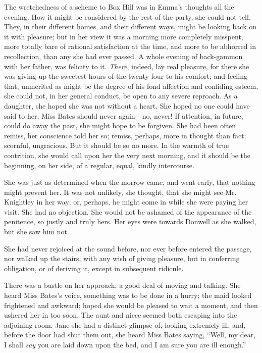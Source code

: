 The wretchedness of a scheme to Box Hill was in Emma's thoughts all the evening. How it might be considered by the rest of the party, she could not tell. They, in their different homes, and their different ways, might be looking back on it with pleasure; but in her view it was a morning more completely misspent, more totally bare of rational satisfaction at the time, and more to be abhorred in recollection, than any she had ever passed. A whole evening of back-gammon with her father, was felicity to it. {\em There}, indeed, lay real pleasure, for there she was giving up the sweetest hours of the twenty-four to his comfort; and feeling that, unmerited as might be the degree of his fond affection and confiding esteem, she could not, in her general conduct, be open to any severe reproach. As a daughter, she hoped she was not without a heart. She hoped no one could have said to her,  Miss Bates should never again---no, never! If attention, in future, could do away the past, she might hope to be forgiven. She had been often remiss, her conscience told her so; remiss, perhaps, more in thought than fact; scornful, ungracious. But it should be so no more. In the warmth of true contrition, she would call upon her the very next morning, and it should be the beginning, on her side, of a regular, equal, kindly intercourse.

She was just as determined when the morrow came, and went early, that nothing might prevent her. It was not unlikely, she thought, that she might see Mr. Knightley in her way; or, perhaps, he might come in while she were paying her visit. She had no objection. She would not be ashamed of the appearance of the penitence, so justly and truly hers. Her eyes were towards Donwell as she walked, but she saw him not.

 She had never rejoiced at the sound before, nor ever before entered the passage, nor walked up the stairs, with any wish of giving pleasure, but in conferring obligation, or of deriving it, except in subsequent ridicule.

There was a bustle on her approach; a good deal of moving and talking. She heard Miss Bates's voice, something was to be done in a hurry; the maid looked frightened and awkward; hoped she would be pleased to wait a moment, and then ushered her in too soon. The aunt and niece seemed both escaping into the adjoining room. Jane she had a distinct glimpse of, looking extremely ill; and, before the door had shut them out, she heard Miss Bates saying, “Well, my dear, I shall {\em say} you are laid down upon the bed, and I am sure you are ill enough.”

